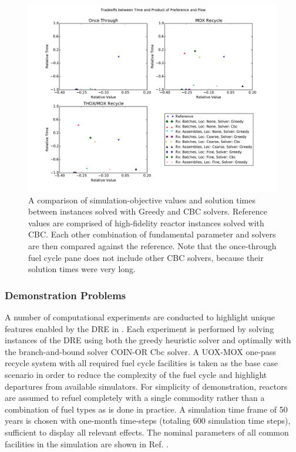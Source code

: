 \begin{figure}[h!]
  \begin{center}
    \includegraphics[width=.7\textwidth]{1k_compare_front_pref_flow.pdf}
    \caption{
      \label{fig:solver_comparison}
      A comparison of simulation-objective values and solution times between
      instances solved with Greedy and CBC solvers. Reference values are
      comprised of high-fidelity reactor instances solved with CBC. Each other
      combination of fundamental parameter and solvers are then compared against
      the reference. Note that the once-through fuel cycle pane does not include
      other CBC solvers, because their solution times were very long.
    }
  \end{center}
\end{figure}

\subsubsection{Demonstration Problems}

A number of computational experiments are conducted to highlight unique
features enabled by the \gls{DRE} in \Cyclus{}. Each experiment is performed by
solving instances of the \gls{DRE} using both the greedy heuristic solver and
optimally with the branch-and-bound solver \gls{COIN-OR} Cbc solver. A
UOX-MOX one-pass recycle system with all required fuel cycle facilities is
taken as the base case scenario in order to reduce the complexity of the fuel
cycle and highlight departures from available simulators. For simplicity of
demonstration, reactors are assumed to refuel completely with a single
commodity rather than a combination of fuel types as is done in practice. A
simulation time frame of 50 years is chosen with one-month time-steps
(totaling 600 simulation time steps), sufficient to display all relevant
effects. The nominal parameters of all common facilities in the simulation are
shown in Ref. .

